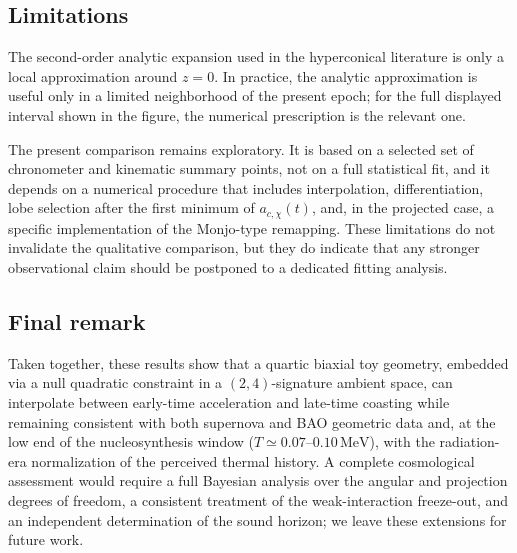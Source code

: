 \documentclass[preprint,12pt]{elsarticle}
\begin{document}
\subsection{Limitations}

The second-order analytic expansion used in the hyperconical literature is only a local approximation around $z=0$. In practice, the analytic approximation is useful only in a limited neighborhood of the present epoch; for the full displayed interval shown in the figure, the numerical prescription is the relevant one.

The present comparison remains exploratory. It is based on a selected set of chronometer and kinematic summary points, not on a full statistical fit, and it depends on a numerical procedure that includes interpolation, differentiation, lobe selection after the first minimum of $a_{c,\chi}(t)$, and, in the projected case, a specific implementation of the Monjo-type remapping. These limitations do not invalidate the qualitative comparison, but they do indicate that any stronger observational claim should be postponed to a dedicated fitting analysis.

\subsection{Final remark}

Taken together, these results show that a quartic biaxial toy geometry, embedded via a null quadratic constraint in a $(2,4)$-signature ambient space, can interpolate between early-time acceleration and late-time coasting while remaining consistent with both supernova and BAO geometric data and, at the low end of the nucleosynthesis window ($T\simeq0.07$--$0.10\,\mathrm{MeV}$), with the radiation-era normalization of the perceived thermal history. A complete cosmological assessment would require a full Bayesian analysis over the angular and projection degrees of freedom, a consistent treatment of the weak-interaction freeze-out, and an independent determination of the sound horizon; we leave these extensions for future work.


\end{document}
